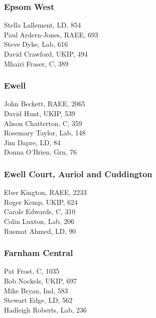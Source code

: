 \documentclass[a4paper,openany,10pt]{book}
\begin{document}
\subsubsection*{Epsom West}



Stella Lallement, LD, 854\\
Paul Ardern-Jones, RAEE, 693\\
Steve Dyke, Lab, 616\\
David Crawford, UKIP, 494\\
Mhairi Fraser, C, 389\\


\subsubsection*{Ewell}



John Beckett, RAEE, 2065\\
David Hunt, UKIP, 539\\
Alison Chatterton, C, 359\\
Rosemary Taylor, Lab, 148\\
Jim Dapre, LD, 84\\
Donna O'Brien, Grn, 76\\


\subsubsection*{Ewell Court, Auriol and Cuddington}



Eber Kington, RAEE, 2233\\
Roger Kemp, UKIP, 624\\
Carole Edwards, C, 310\\
Colin Luxton, Lab, 206\\
Rusmat Ahmed, LD, 90\\


\subsubsection*{Farnham Central}



Pat Frost, C, 1035\\
Bob Nockels, UKIP, 697\\
Mike Bryan, Ind, 583\\
Stewart Edge, LD, 562\\
Hadleigh Roberts, Lab, 236\\
\end{document}
